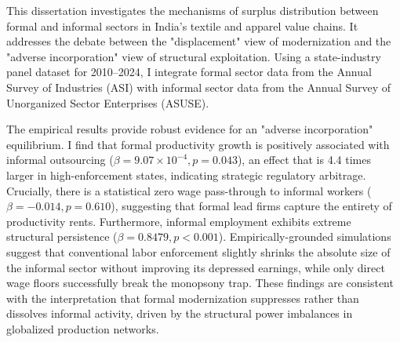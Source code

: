 This dissertation investigates the mechanisms of surplus distribution between formal and informal sectors in India's textile and apparel value chains. It addresses the debate between the "displacement" view of modernization and the "adverse incorporation" view of structural exploitation. Using a state-industry panel dataset for 2010--2024, I integrate formal sector data from the Annual Survey of Industries (ASI) with informal sector data from the Annual Survey of Unorganized Sector Enterprises (ASUSE).

The empirical results provide robust evidence for an "adverse incorporation" equilibrium. I find that formal productivity growth is positively associated with informal outsourcing ($\beta = 9.07 \times 10^{-4}, p=0.043$), an effect that is 4.4 times larger in high-enforcement states, indicating strategic regulatory arbitrage. Crucially, there is a statistical zero wage pass-through to informal workers ($\beta = -0.014, p=0.610$), suggesting that formal lead firms capture the entirety of productivity rents. Furthermore, informal employment exhibits extreme structural persistence ($\beta = 0.8479, p<0.001$). Empirically-grounded simulations suggest that conventional labor enforcement slightly shrinks the absolute size of the informal sector without improving its depressed earnings, while only direct wage floors successfully break the monopsony trap. These findings are consistent with the interpretation that formal modernization suppresses rather than dissolves informal activity, driven by the structural power imbalances in globalized production networks.
